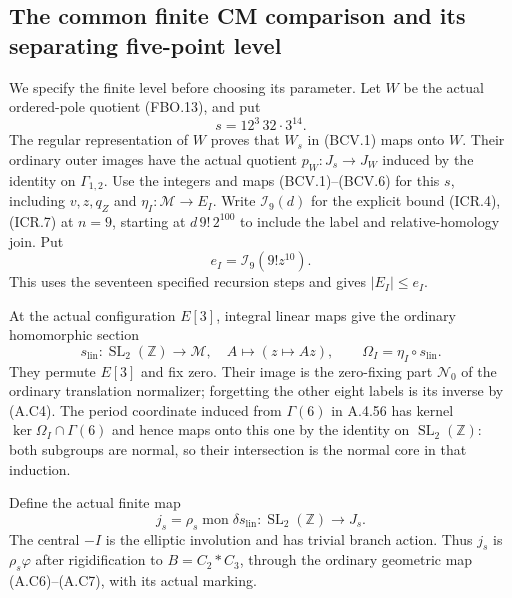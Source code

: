 \subsection{The common finite CM comparison and its separating five-point level}

We specify the finite level before choosing its parameter.
Let $W$ be the actual ordered-pole quotient (FBO.13), and put
\[
                         s=12^3\,32\cdot3^{14}.
                                                               \tag{FCP.1}
\]
The regular representation of $W$ proves that $W_s$ in
(BCV.1) maps onto $W$.  Their ordinary outer images have
the actual quotient $p_W:J_s\to J_W$ induced by the
identity on $\Gamma_{1,2}$.
Use the integers and maps (BCV.1)--(BCV.6) for this $s$,
including $v,z,q_Z$ and $\eta_I:\mathcal M\to E_I$.
Write $\mathcal I_9(d)$ for the explicit bound (ICR.4),(ICR.7)
at $n=9$, starting at $d\,9!\,2^{100}$ to include the
label and relative-homology join.  Put
\[
                      e_I=\mathcal I_9(9!z^{10}).
                                                               \tag{FCP.2}
\]
This uses the seventeen specified recursion steps and gives
$|E_I|\leq e_I$.

At the actual configuration $E[3]$, integral linear maps
give the ordinary homomorphic section
\[
 s_{\mathrm{lin}}:\operatorname{SL}_2(\mathbb Z)\to\mathcal M,
 \quad A\mapsto(z\mapsto Az),\qquad
 \Omega_I=\eta_I\circ s_{\mathrm{lin}}.
                                                               \tag{FCP.3}
\]
They permute $E[3]$ and fix zero.  Their image is the
zero-fixing part $\mathcal N_0$ of the ordinary translation
normalizer; forgetting the other eight labels is its
inverse by (A.C4).
The period coordinate induced from $\Gamma(6)$ in A.4.56
has kernel $\ker\Omega_I\cap\Gamma(6)$ and hence maps
onto this one by the identity on $\operatorname{SL}_2(\mathbb Z)$:
both subgroups are normal, so their intersection is the
normal core in that induction.

Define the actual finite map
\[
 j_s=\rho_s\operatorname{mon}\delta s_{\mathrm{lin}}:
             \operatorname{SL}_2(\mathbb Z)\to J_s.
                                                               \tag{FCP.4}
\]
The central $-I$ is the elliptic involution and has trivial
branch action.  Thus $j_s$ is $\rho_s\varphi$ after
rigidification to $B=C_2*C_3$, through the ordinary geometric
map (A.C6)--(A.C7), with its actual marking.

